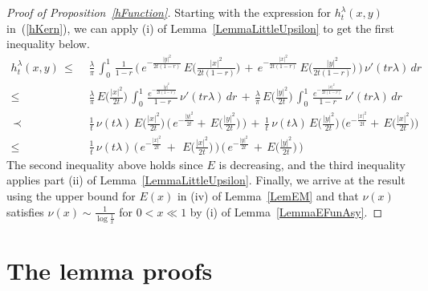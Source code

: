 \documentclass[10pt]{article}
\numberwithin{equation}{section}
\theoremstyle{definition}
\begin{document}
\vspace{.3cm}



\begin{proof}[Proof of Proposition~\ref{hFunction}] Starting with the expression for    $h_{t}^{\lambda}(x,y)$ in~(\ref{hKern}), we can apply (i) of Lemma~\ref{LemmaLittleUpsilon} to get the first inequality below.
\begin{align*}
  h_{t}^{\lambda}(x,y)\,\leq \, &\,   
 \frac{\lambda}{\pi}\,  \int_{0}^1 \,\frac{1}{1-r}\,\Bigg(\, e^{-\frac{ |y|^2}{ 2t(1-r)}   } \,E\bigg(\frac{|x|^2}{2t(1-r)}\bigg)\,+\, e^{-\frac{ |x|^2}{ 2t(1-r)}   } \,E\bigg(\frac{|y|^2}{2t(1-r)}\bigg)\,\Bigg) \, \nu'( tr\lambda  )\,dr \\  \leq \,&\, \frac{\lambda}{\pi} \,E\bigg(\frac{|x|^2}{2t}\bigg)\,\int_{0}^1 \,\frac{ e^{-\frac{ |y|^2}{2 t(1-r)}   }}{1-r}\, \nu'( t r\lambda  ) \,dr \,+\, \frac{\lambda}{\pi}\, E\bigg(\frac{|y|^2}{2t}\bigg)\,\int_{0}^1 \, \frac{e^{-\frac{ |x|^2}{2 t(1-r)}   }}{1-r} \,\nu'( t r\lambda  )\,dr
 \\    \, \prec\,&\, \frac{1}{ t}\,\nu( t \lambda)\,E\bigg(\frac{|x|^2}{2t}\bigg)\,\bigg( \,e^{-\frac{|y|^2}{2t}  } +  \,E\bigg(\frac{|y|^2}{2t}\bigg)\,\bigg) \,+\, \frac{ 1}{ t}\,\nu( t\lambda)\,E\bigg(\frac{|y|^2}{2t}\bigg)\,\bigg( e^{-\frac{|x|^2}{2t}  } + \,E\bigg(\frac{|x|^2}{2t}\bigg)\bigg) 
\\  \leq \,&\, \frac{1}{t}\,\nu( t \lambda)\,\bigg(\,  e^{-\frac{|x|^2}{2t}  }\,+\,\ E\bigg(\frac{|x|^2}{2t}\bigg) \,\bigg)\,\bigg(\, e^{-\frac{|y|^2}{2t}  }\,+\,E\bigg(\frac{|y|^2}{2t}\bigg)\,  \bigg)
\end{align*}
The second inequality above holds since $E$ is decreasing, and the third inequality applies part (ii) of Lemma~\ref{LemmaLittleUpsilon}.  Finally, we arrive at the result using  the upper bound for $E(x)$ in (iv) of Lemma~\ref{LemEM}  and that $\nu(x)$  satisfies $\nu(x)\sim \frac{1}{\log \frac{1}{x}}$ for $0<x\ll 1$ by (i) of Lemma~\ref{LemmaEFunAsy}.
\end{proof}


 
   
   
 












\section{The lemma proofs} \label{SectionMiscProofs}
\end{document}

